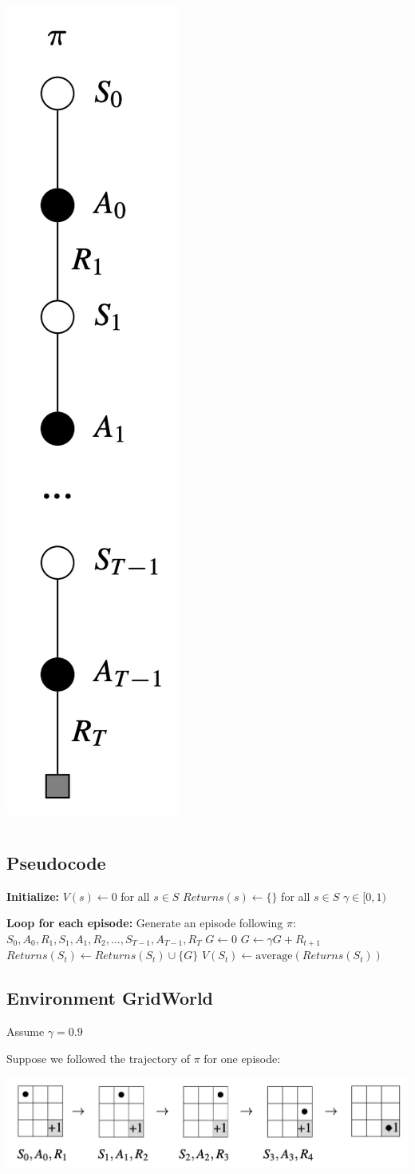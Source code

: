 \documentclass[
  letterpaper,
  DIV=11,
  numbers=noendperiod]{scrreprt}
\begin{document}
\begin{center}
\includegraphics[width=0.1\linewidth,height=\textheight,keepaspectratio]{lecture5/images/MonteCarlo.png}
\end{center}

\subsection{Pseudocode}\label{pseudocode-5}

\begin{algorithm}[htb!]
\caption{Monte Carlo Prediction}
\begin{algorithmic}[1]
\State \textbf{Initialize:} 
\State $V(s) \gets 0$ for all $s \in S$
\State $Returns(s) \gets \{\}$ for all $s \in S$
\State $\gamma \in [0,1)$

\State \textbf{Loop for each episode:}
\State Generate an episode following $\pi$: $S_{0}, A_{0}, R_{1}, S_{1}, A_{1}, R_{2}, \dots, S_{T-1}, A_{T-1}, R_{T}$
\State $G \gets 0$
    \State $G \gets \gamma G + R_{t+1}$
      
        \State $Returns(S_{t}) \gets Returns(S_{t}) \cup \{G\}$
        \State $V(S_{t}) \gets \text{average}(Returns(S_{t}))$
    \Endif
\Endfor

\end{algorithmic}
\end{algorithm}

\subsection{Environment GridWorld}\label{environment-gridworld-4}

Assume \(\gamma = 0.9\)

Suppose we followed the trajectory of \(\pi\) for one episode:

\begin{center}
\includegraphics[width=0.65\linewidth,height=\textheight,keepaspectratio]{lecture5/images/MonteCarloSequential.png}
\end{center}
\end{document}
